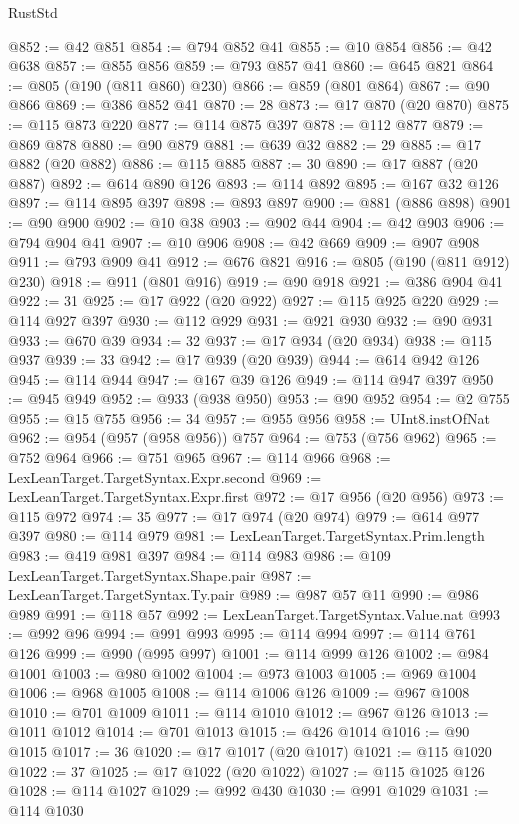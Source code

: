 \begin{lexlean}{RustStd}
\begin{coremodule}
@852 := @42 @851
@854 := @794 @852 @41
@855 := @10 @854
@856 := @42 @638
@857 := @855 @856
@859 := @793 @857 @41
@860 := @645 @821
@864 := @805 (@190 (@811 @860) @230)
@866 := @859 (@801 @864)
@867 := @90 @866
@869 := @386 @852 @41
@870 := 28
@873 := @17 @870 (@20 @870)
@875 := @115 @873 @220
@877 := @114 @875 @397
@878 := @112 @877
@879 := @869 @878
@880 := @90 @879
@881 := @639 @32
@882 := 29
@885 := @17 @882 (@20 @882)
@886 := @115 @885
@887 := 30
@890 := @17 @887 (@20 @887)
@892 := @614 @890 @126
@893 := @114 @892
@895 := @167 @32 @126
@897 := @114 @895 @397
@898 := @893 @897
@900 := @881 (@886 @898)
@901 := @90 @900
@902 := @10 @38
@903 := @902 @44
@904 := @42 @903
@906 := @794 @904 @41
@907 := @10 @906
@908 := @42 @669
@909 := @907 @908
@911 := @793 @909 @41
@912 := @676 @821
@916 := @805 (@190 (@811 @912) @230)
@918 := @911 (@801 @916)
@919 := @90 @918
@921 := @386 @904 @41
@922 := 31
@925 := @17 @922 (@20 @922)
@927 := @115 @925 @220
@929 := @114 @927 @397
@930 := @112 @929
@931 := @921 @930
@932 := @90 @931
@933 := @670 @39
@934 := 32
@937 := @17 @934 (@20 @934)
@938 := @115 @937
@939 := 33
@942 := @17 @939 (@20 @939)
@944 := @614 @942 @126
@945 := @114 @944
@947 := @167 @39 @126
@949 := @114 @947 @397
@950 := @945 @949
@952 := @933 (@938 @950)
@953 := @90 @952
@954 := @2 @755
@955 := @15 @755
@956 := 34
@957 := @955 @956
@958 := UInt8.instOfNat
@962 := @954 (@957 (@958 @956)) @757
@964 := @753 (@756 @962)
@965 := @752 @964
@966 := @751 @965
@967 := @114 @966
@968 := LexLeanTarget.TargetSyntax.Expr.second
@969 := LexLeanTarget.TargetSyntax.Expr.first
@972 := @17 @956 (@20 @956)
@973 := @115 @972
@974 := 35
@977 := @17 @974 (@20 @974)
@979 := @614 @977 @397
@980 := @114 @979
@981 := LexLeanTarget.TargetSyntax.Prim.length
@983 := @419 @981 @397
@984 := @114 @983
@986 := @109 LexLeanTarget.TargetSyntax.Shape.pair
@987 := LexLeanTarget.TargetSyntax.Ty.pair
@989 := @987 @57 @11
@990 := @986 @989
@991 := @118 @57
@992 := LexLeanTarget.TargetSyntax.Value.nat
@993 := @992 @96
@994 := @991 @993
@995 := @114 @994
@997 := @114 @761 @126
@999 := @990 (@995 @997)
@1001 := @114 @999 @126
@1002 := @984 @1001
@1003 := @980 @1002
@1004 := @973 @1003
@1005 := @969 @1004
@1006 := @968 @1005
@1008 := @114 @1006 @126
@1009 := @967 @1008
@1010 := @701 @1009
@1011 := @114 @1010
@1012 := @967 @126
@1013 := @1011 @1012
@1014 := @701 @1013
@1015 := @426 @1014
@1016 := @90 @1015
@1017 := 36
@1020 := @17 @1017 (@20 @1017)
@1021 := @115 @1020
@1022 := 37
@1025 := @17 @1022 (@20 @1022)
@1027 := @115 @1025 @126
@1028 := @114 @1027
@1029 := @992 @430
@1030 := @991 @1029
@1031 := @114 @1030

\end{coremodule}
\end{lexlean}
